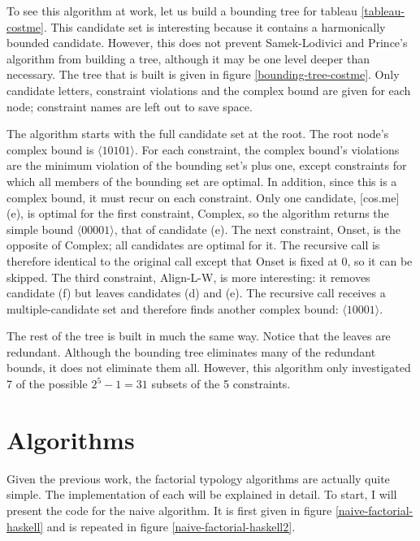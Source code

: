 \documentclass[11pt]{article}
\begin{document}
To see this algorithm at work, let us build a bounding tree for
tableau \ref{tableau-costme}. This candidate set is interesting
because it contains a harmonically bounded candidate. However, this
does not prevent Samek-Lodivici and Prince's algorithm from building a
tree, although it may be one level deeper than necessary. The tree
that is built is given in figure \ref{bounding-tree-costme}. Only
candidate letters, constraint violations and the complex bound
are given for each node; constraint names are left out to save space.

The algorithm starts with the full candidate set at the root. The root
node's complex bound is $\langle10101\rangle$. For each constraint,
the complex bound's violations are the minimum violation of the
bounding set's plus one, except constraints for which all members of
the bounding set are optimal. In addition, since this is a complex
bound, it must recur on each constraint. Only one candidate, [cos.me]
(e), is optimal for the first constraint, {\sc *Complex}, so the
algorithm returns the simple bound $\langle00001\rangle$, that of
candidate (e). The next constraint, {\sc Onset}, is the opposite of
{\sc *Complex}; all candidates are optimal for it. The recursive call
is therefore identical to the original call except that {\sc Onset} is
fixed at 0, so it can be skipped.  The third constraint, {\sc
  Align-L-W}, is more interesting: it
removes candidate (f) but leaves candidates (d) and (e). The recursive
call receives a multiple-candidate set and therefore finds another
complex bound: $\langle10001\rangle$.

The rest of the tree is built in much the same way. Notice that the
leaves are redundant. Although the bounding tree eliminates many of
the redundant bounds, it does not eliminate them all. However, this
algorithm only investigated 7 of the possible $2^5-1 = 31$ subsets of
the 5 constraints.

\section{Algorithms}
Given the previous work, the factorial typology algorithms are
actually quite simple. The implementation of each will be explained in
detail. To start, I will present the code for the naive algorithm. It
is first given in figure \ref{naive-factorial-haskell} and is repeated
in figure \ref{naive-factorial-haskell2}.
\end{document}
